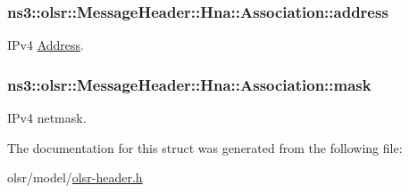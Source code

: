 \subsubsection[{\texorpdfstring{address}{address}}]{ ns3\+::olsr\+::\+Message\+Header\+::\+Hna\+::\+Association\+::address}\hypertarget{structns3_1_1olsr_1_1MessageHeader_1_1Hna_1_1Association_a871247cb117a25255712a3765e1aa37b}{}\label{structns3_1_1olsr_1_1MessageHeader_1_1Hna_1_1Association_a871247cb117a25255712a3765e1aa37b}


I\+Pv4 \hyperlink{classns3_1_1Address}{Address}. 

\subsubsection[{\texorpdfstring{mask}{mask}}]{ ns3\+::olsr\+::\+Message\+Header\+::\+Hna\+::\+Association\+::mask}\hypertarget{structns3_1_1olsr_1_1MessageHeader_1_1Hna_1_1Association_a794dfc31d34bc49d7812efff57f2bb2d}{}\label{structns3_1_1olsr_1_1MessageHeader_1_1Hna_1_1Association_a794dfc31d34bc49d7812efff57f2bb2d}


I\+Pv4 netmask. 



The documentation for this struct was generated from the following file\+:\begin{DoxyCompactItemize}
\item 
olsr/model/\hyperlink{olsr-header_8h}{olsr-\/header.\+h}\end{DoxyCompactItemize}
